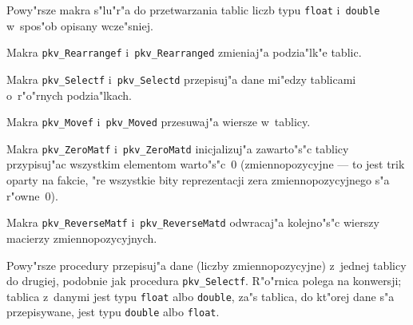 Powy"rsze makra s"lu"r"a do przetwarzania tablic liczb typu \texttt{float}
i~\texttt{double} w~spos"ob opisany wcze"sniej.

Makra \texttt{pkv\_Rearrangef} i~\texttt{pkv\_Rearranged} zmieniaj"a
podzia"lk"e tablic.

Makra \texttt{pkv\_Selectf} i~\texttt{pkv\_Selectd} przepisuj"a dane
mi"edzy tab\-li\-ca\-mi o~r"o"rnych podzia"lkach.

Makra \texttt{pkv\_Movef} i~\texttt{pkv\_Moved} przesuwaj"a wiersze
w~tablicy.

Makra \texttt{pkv\_ZeroMatf} i~\texttt{pkv\_ZeroMatd} inicjalizuj"a
zawarto"s"c tablicy przypisuj"ac wszystkim elementom warto"s"c~$0$
(zmiennopozycyjne --- to jest trik oparty na fakcie, "re wszystkie
bity reprezentacji zera zmiennopozycyjnego s"a r"owne~$0$).

Makra \texttt{pkv\_ReverseMatf} i~\texttt{pkv\_ReverseMatd} odwracaj"a
kolejno"s"c wierszy macierzy zmiennopozycyjnych.


\vspace{\bigskipamount}
Powy"rsze procedury przepisuj"a dane (liczby zmiennopozycyjne) z~jednej
tablicy do drugiej, podobnie jak procedura \texttt{pkv\_Selectf}. R"o"rnica
polega na konwersji; tablica z~danymi jest typu \texttt{float} albo
\texttt{double}, za"s tablica, do kt"orej dane s"a przepisywane, jest
typu \texttt{double} albo \texttt{float}.

